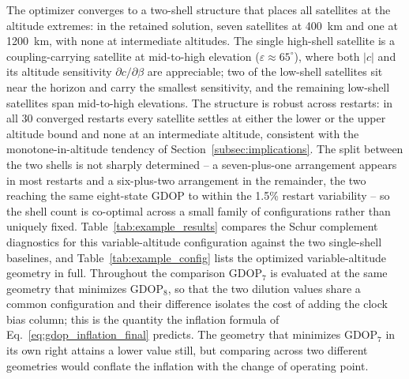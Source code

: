 \documentclass[letterpaper,times]{IONconf-v2}
\theoremstyle{plain}
\theoremstyle{remark}
\begin{document}
The optimizer converges to a two-shell structure that places all satellites at the altitude extremes: in the retained solution, seven satellites at 400~km and one at 1200~km, with none at intermediate altitudes. The single high-shell satellite is a coupling-carrying satellite at mid-to-high elevation ($\varepsilon \approx 65^\circ$), where both $|c|$ and its altitude sensitivity $\partial c/\partial\beta$ are appreciable; two of the low-shell satellites sit near the horizon and carry the smallest sensitivity, and the remaining low-shell satellites span mid-to-high elevations. The structure is robust across restarts: in all 30 converged restarts every satellite settles at either the lower or the upper altitude bound and none at an intermediate altitude, consistent with the monotone-in-altitude tendency of Section~\ref{subsec:implications}. The split between the two shells is not sharply determined -- a seven-plus-one arrangement appears in most restarts and a six-plus-two arrangement in the remainder, the two reaching the same eight-state GDOP to within the 1.5\% restart variability -- so the shell count is co-optimal across a small family of configurations rather than uniquely fixed. Table~\ref{tab:example_results} compares the Schur complement diagnostics for this variable-altitude configuration against the two single-shell baselines, and Table~\ref{tab:example_config} lists the optimized variable-altitude geometry in full. Throughout the comparison $\mathrm{GDOP}_7$ is evaluated at the same geometry that minimizes $\mathrm{GDOP}_8$, so that the two dilution values share a common configuration and their difference isolates the cost of adding the clock bias column; this is the quantity the inflation formula of Eq.~\eqref{eq:gdop_inflation_final} predicts. The geometry that minimizes $\mathrm{GDOP}_7$ in its own right attains a lower value still, but comparing across two different geometries would conflate the inflation with the change of operating point.
\end{document}
